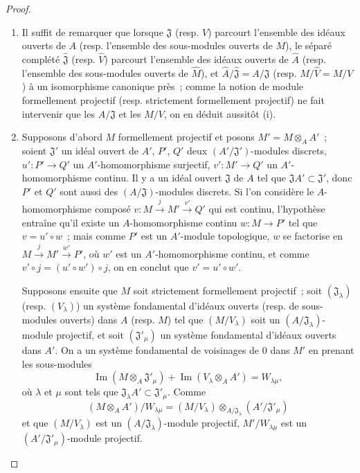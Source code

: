 \begin{proof}
\begin{enumerate}
  \item[(i)] Il suffit de remarquer que lorsque $\mathfrak J$ (resp. $V$)
  parcourt l'ensemble des idéaux ouverts de $A$ (resp. l'ensemble des
  sous-modules ouverts de $M$), le séparé complété $\hat{\mathfrak J}$
  (resp. $\hat V$) parcourt l'ensemble des idéaux ouverts de $\hat A$
  (resp. l'ensemble des sous-modules ouverts de $\hat M$), et
  $\hat A/\hat{\mathfrak J}=A/\mathfrak J$ (resp.
  $\hat M/\hat V=M/V$) à un isomorphisme canonique près~; comme la notion
  de module formellement projectif (resp. strictement formellement projectif)
  ne fait intervenir que les $A/\mathfrak J$ et les $M/V$, on en déduit
  aussitôt (i).
  \item[(ii)] Supposons d'abord $M$ formellement projectif et posons
  $M'=M\otimes_A A'$~; soient $\mathfrak J'$ un idéal ouvert de $A'$, $P'$,
  $Q'$ deux $(A'/\mathfrak J')$-modules discrets, $u':P'\to Q'$ un
  $A'$-homomorphisme surjectif, $v':M'\to Q'$ un $A'$-homomorphisme continu.
  Il y a un idéal ouvert $\mathfrak J$ de $A$ tel que
  $\mathfrak JA'\subset\mathfrak J'$, donc $P'$ et $Q'$ sont aussi des
  $(A/\mathfrak J)$-modules discrets. Si l'on considère le
  $A$-homomorphisme composé $v:M\xrightarrow{j}M'\xrightarrow{v'}Q'$ qui est
  continu, l'hypothèse entraîne qu'il existe un $A$-homomorphisme continu
  $w:M\to P'$ tel que $v=u'\circ w$~; mais comme $P'$ est un $A'$-module
  topologique, $w$ se factorise en
  $M\xrightarrow{j}M'\xrightarrow{w'}P'$, où $w'$ est un $A'$-homomorphisme
  continu, et comme $v'\circ j=(u'\circ w')\circ j$, on en conclut que
  $v'=u'\circ w'$.

  Supposons ensuite que $M$ soit strictement formellement projectif~; soit
  $(\mathfrak J_\lambda)$ (resp. $(V_\lambda)$) un système fondamental
  d'idéaux ouverts (resp. de sous-modules ouverts) dans $A$ (resp. $M$) tel
  que $(M/V_\lambda)$ soit un $(A/\mathfrak J_\lambda)$-module projectif,
  et soit $(\mathfrak J'_\mu)$ un système fondamental d'idéaux ouverts dans
  $A'$. On a un système fondamental de voisinages de $0$ dans $M'$ en prenant
  les sous-modules
  \[
    \operatorname{Im}(M\otimes_A\mathfrak J'_\mu)
    +\operatorname{Im}(V_\lambda\otimes_A A')=W_{\lambda\mu},
  \]
  où $\lambda$ et $\mu$ sont tels que
  $\mathfrak J_\lambda A'\subset\mathfrak J'_\mu$. Comme
  \[
    (M\otimes_A A')/W_{\lambda\mu}
    =(M/V_\lambda)\otimes_{A/\mathfrak J_\lambda}
      (A'/\mathfrak J'_\mu)
  \]
  et que $(M/V_\lambda)$ est un
  $(A/\mathfrak J_\lambda)$-module projectif, $M'/W_{\lambda\mu}$
  est un $(A'/\mathfrak J'_\mu)$-module projectif.
\end{enumerate}
\end{proof}


